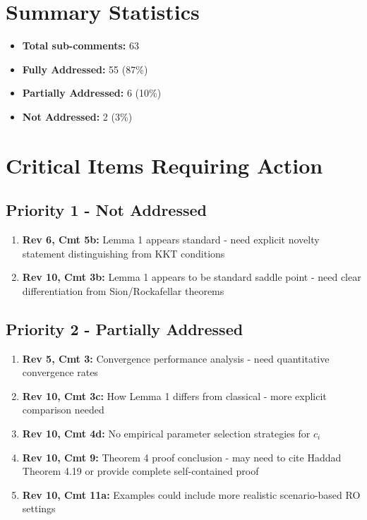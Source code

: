 \documentclass{article}
\begin{document}
\section*{Summary Statistics}

\begin{itemize}
\item \textbf{Total sub-comments:} 63
\item \textbf{Fully Addressed:} 55 (87\%)
\item \textbf{Partially Addressed:} 6 (10\%)
\item \textbf{Not Addressed:} 2 (3\%)
\end{itemize}

\section*{Critical Items Requiring Action}

\subsection*{Priority 1 - Not Addressed}
\begin{enumerate}
\item \textbf{Rev 6, Cmt 5b:} Lemma 1 appears standard - need explicit novelty statement distinguishing from KKT conditions
\item \textbf{Rev 10, Cmt 3b:} Lemma 1 appears to be standard saddle point - need clear differentiation from Sion/Rockafellar theorems
\end{enumerate}

\subsection*{Priority 2 - Partially Addressed}
\begin{enumerate}
\item \textbf{Rev 5, Cmt 3:} Convergence performance analysis - need quantitative convergence rates
\item \textbf{Rev 10, Cmt 3c:} How Lemma 1 differs from classical - more explicit comparison needed
\item \textbf{Rev 10, Cmt 4d:} No empirical parameter selection strategies for $c_i$
\item \textbf{Rev 10, Cmt 9:} Theorem 4 proof conclusion - may need to cite Haddad Theorem 4.19 or provide complete self-contained proof
\item \textbf{Rev 10, Cmt 11a:} Examples could include more realistic scenario-based RO settings
\end{enumerate}
\end{document}
